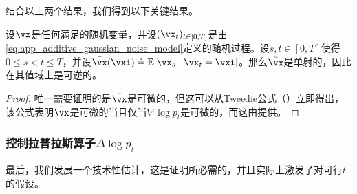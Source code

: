 \documentclass[../../book-main_zh.tex]{subfiles}
\begin{document}
结合以上两个结果，我们得到以下关键结果。

\begin{corollary}\label{cor:gribonval_A2}
    设\(\vx\)是任何满足的随机变量，并设\((\vx_{t})_{t \in [0, T]}\)是由\eqref{eq:app_additive_gaussian_noise_model}定义的随机过程。设\(s, t \in [0, T]\)使得\(0 \leq s < t \leq T\)，并设\(\bar{\vx}(\vxi) \doteq \Ex[\vx_{s} \mid \vx_{t} = \vxi]\)。那么\(\bar{\vx}\)是单射的，因此在其值域上是可逆的。
\end{corollary}
\begin{proof}
    唯一需要证明的是\(\bar{\vx}\)是可微的，但这可以从Tweedie公式（）立即得出，该公式表明\(\bar{\vx}\)是可微的当且仅当\(\nabla \log p_{t}\)是可微的，而这由提供。
\end{proof}

\subsubsection{控制拉普拉斯算子\(\Delta \log p_{t}\)}

最后，我们发展一个技术性估计，这是证明所必需的，并且实际上激发了对可行\(t\)的假设。
\end{document}

